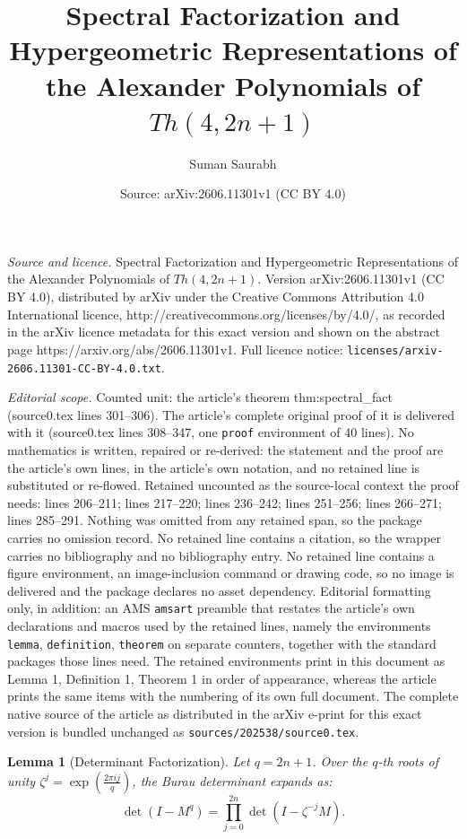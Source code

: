 \documentclass[10pt,a4paper]{amsart}
\title{Spectral Factorization and Hypergeometric Representations of the Alexander Polynomials of $Th(4,2n+1)$}
\author{Suman Saurabh}
\date{Source: arXiv:2606.11301v1 (CC BY 4.0)}
\newtheorem{lemma}{Lemma}
\begin{document}
\maketitle

\noindent\emph{Source and licence.} Spectral Factorization and Hypergeometric Representations of the Alexander Polynomials of $Th(4,2n+1)$. Version arXiv:2606.11301v1 (CC BY 4.0), distributed by arXiv under the Creative Commons Attribution 4.0 International licence, http://creativecommons.org/licenses/by/4.0/, as recorded in the arXiv licence metadata for this exact version and shown on the abstract page https://arxiv.org/abs/2606.11301v1. Full licence notice: \texttt{licenses/arxiv-2606.11301-CC-BY-4.0.txt}.\par\smallskip

\noindent\textit{Editorial scope.} Counted unit: the article's theorem thm:spectral\_fact (source0.tex lines 301--306). The article's complete original proof of it is delivered with it (source0.tex lines 308--347, one \texttt{proof} environment of 40 lines). No mathematics is written, repaired or re-derived: the statement and the proof are the article's own lines, in the article's own notation, and no retained line is substituted or re-flowed.  Retained uncounted as the source-local context the proof needs: lines 206--211; lines 217--220; lines 236--242; lines 251--256; lines 266--271; lines 285--291.  Nothing was omitted from any retained span, so the package carries no omission record.  No retained line contains a citation, so the wrapper carries no bibliography and no bibliography entry.  No retained line contains a figure environment, an image-inclusion command or drawing code, so no image is delivered and the package declares no asset dependency.  Editorial formatting only, in addition: an AMS \texttt{amsart} preamble that restates the article's own declarations and macros used by the retained lines, namely the environments \texttt{lemma}, \texttt{definition}, \texttt{theorem} on separate counters, together with the standard packages those lines need.  The retained environments print in this document as Lemma 1, Definition 1, Theorem 1 in order of appearance, whereas the article prints the same items with the numbering of its own full document.  The complete native source of the article as distributed in the arXiv e-print for this exact version is bundled unchanged as \texttt{sources/202538/source0.tex}.
\begin{lemma}[Determinant Factorization]\label{lem:det_fact}
Let $q = 2n+1$. Over the $q$-th roots of unity $\zeta^j = \exp\left(\frac{2\pi i j}{q}\right)$, the Burau determinant expands as:
\begin{equation}
\det(I - M^q) = \prod_{j=0}^{2n} \det(I - \zeta^{-j} M).
\end{equation}
\end{lemma}
\end{document}

